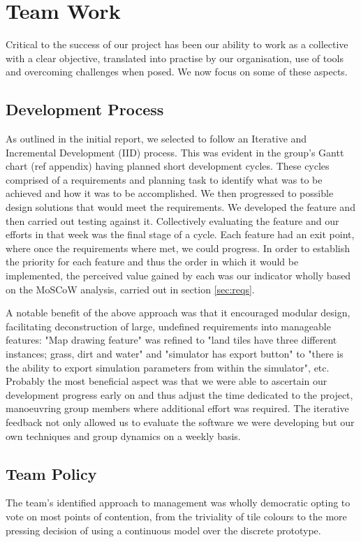 \section{Team Work}
\label{sec:team_work}
Critical to the success of our project has been our ability to work as a collective with a clear objective, translated into practise by our organisation, use of tools and overcoming challenges when posed. We now focus on some of these aspects.

\subsection{Development Process}
As outlined in the initial report, we selected to follow an Iterative and Incremental Development (IID) process. This was evident in the group's Gantt chart (ref appendix) having planned short development cycles. These cycles comprised of a requirements and planning task to identify what was to be achieved and how it was to be accomplished. We then progressed to possible design solutions that would meet the requirements. We developed the feature and then carried out testing against it. Collectively evaluating the feature and our efforts in that week was the final stage of a cycle. Each feature had an exit point, where once the requirements where met, we could progress. In order to establish the priority for each feature and thus the order in which it would be implemented, the perceived value gained by each was our indicator wholly based on the MoSCoW analysis, carried out in section \ref{sec:reqs}.

A notable benefit of the above approach was that it encouraged modular design, facilitating deconstruction of large, undefined requirements into manageable features: "Map drawing feature" was refined to "land tiles have three different instances; grass, dirt and water" and "simulator has export button" to "there is the ability to export simulation parameters from within the simulator", etc.  
Probably the most beneficial aspect was that we were able to ascertain our development progress early on and thus adjust the time dedicated to the project, manoeuvring group members where additional effort was required. The iterative feedback not only allowed us to evaluate the software we were developing but our own techniques and group dynamics on a weekly basis.

\subsection{Team Policy}
The team's identified approach to management was wholly democratic opting to vote on most points of contention, from the triviality of tile colours to the more pressing decision of using a continuous model over the discrete prototype.

